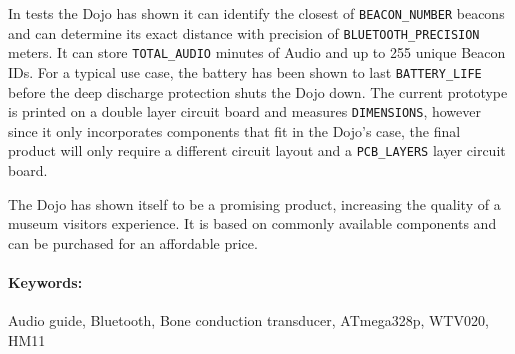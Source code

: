 In tests the Dojo has shown it can identify the closest of \texttt{BEACON\_NUMBER} beacons
	and can determine its exact distance with precision of \texttt{BLUETOOTH\_PRECISION} meters.
It can store \texttt{TOTAL\_AUDIO} minutes of Audio and up to 255 unique Beacon IDs.
For a typical use case, the battery has been shown to last \texttt{BATTERY\_LIFE}
	before the deep discharge protection shuts the Dojo down.
The current prototype is printed on a double layer circuit board and measures \texttt{DIMENSIONS}, 
	however since it only incorporates components that fit in the Dojo's case, 
	the final product will only require a different circuit layout and a \texttt{PCB\_LAYERS} layer circuit board.

The Dojo has shown itself to be a promising product, increasing the quality of a museum visitors experience.
It is based on commonly available components and can be purchased for an affordable price.

\paragraph{Keywords:} Audio guide, Bluetooth, Bone conduction transducer, ATmega328p, WTV020, HM11

%
